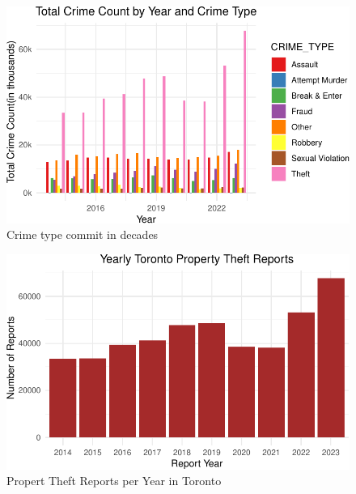 \documentclass[
  letterpaper,
  DIV=11,
  numbers=noendperiod]{scrartcl}
\begin{document}
\begin{figure}

{\centering \includegraphics{paper_files/figure-pdf/fig-crimetype-1.pdf}

}

\caption{\label{fig-crimetype}Crime type commit in decades}

\end{figure}

\begin{figure}

{\centering \includegraphics{paper_files/figure-pdf/fig-theft-1.pdf}

}

\caption{\label{fig-theft}Propert Theft Reports per Year in Toronto}

\end{figure}
\end{document}
